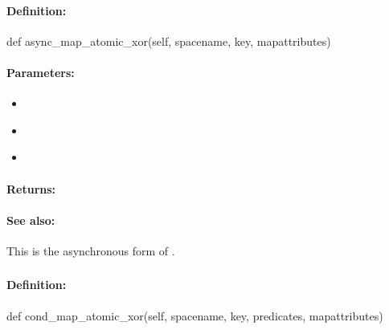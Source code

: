 \paragraph{Definition:}
\begin{pythoncode}
def async_map_atomic_xor(self, spacename, key, mapattributes)
\end{pythoncode}

\paragraph{Parameters:}
\begin{itemize}[noitemsep]
\item {}\\

\item {}\\

\item {}\\

\end{itemize}

\paragraph{Returns:}


\paragraph{See also:}  This is the asynchronous form of .

\pagebreak
\subsubsection{}
\label{api:python:cond_map_atomic_xor}


\paragraph{Definition:}
\begin{pythoncode}
def cond_map_atomic_xor(self, spacename, key, predicates, mapattributes)
\end{pythoncode}

